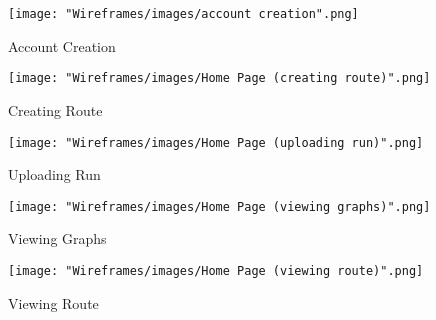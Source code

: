 \documentclass{article}
\begin{document}
\begin{figure}[!htbp]
\texttt{[image: "Wireframes/images/account creation".png]}
\caption{Account Creation}
\end{figure}

\begin{figure}[!htbp]
\texttt{[image: "Wireframes/images/Home Page (creating route)".png]}
\caption{Creating Route}
\end{figure}

\begin{figure}[!htbp]
\texttt{[image: "Wireframes/images/Home Page (uploading run)".png]}
\caption{Uploading Run}
\end{figure}

\begin{figure}[!htbp]
\texttt{[image: "Wireframes/images/Home Page (viewing graphs)".png]}
\caption{Viewing Graphs}
\end{figure}

\begin{figure}[!htbp]
\texttt{[image: "Wireframes/images/Home Page (viewing route)".png]}
\caption{Viewing Route}
\end{figure}
\end{document}
